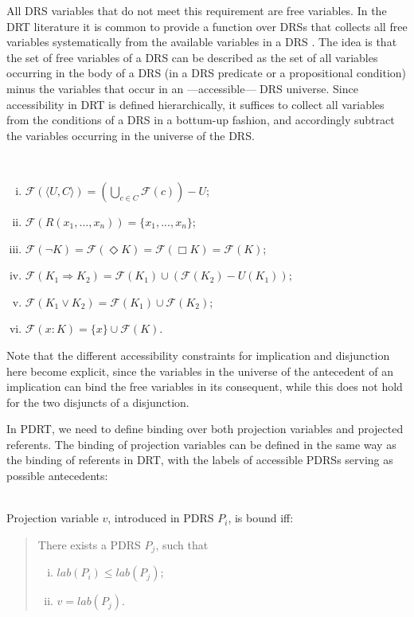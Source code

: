 \noindent All DRS variables that do not meet this requirement are free
variables. In the DRT literature it is common to provide a function over
DRSs that collects all free variables systematically from the available
variables in a DRS
. The idea is that the set of free variables of a DRS can be described
as the set of all variables occurring in the body of a DRS (in a DRS
predicate or a propositional condition) minus the variables that occur in an
---accessible--- DRS universe. Since accessibility in DRT is defined
hierarchically, it suffices to collect all variables from the conditions of
a DRS in a bottum-up fashion, and accordingly subtract the variables
occurring in the universe of the DRS.

\begin{definition}~\label{def:fdrsvs} 
  \begin{enumerate}[i.]
    \item $\mathcal{F}(\langle U, C \rangle)
          = (\bigcup_{c\in C} \mathcal{F}(c)) - U$;
    \item $\mathcal{F}(R(x_1,...,x_n)) = \{x_1,...,x_n\}$;
    \item $\mathcal{F}(\neg K) 
          = \mathcal{F}(\Diamond K) 
          = \mathcal{F}(\Box K)
          = \mathcal{F}(K)$;
    \item $\mathcal{F}(K_1 \Rightarrow K_2)
          = \mathcal{F}(K_1) \cup (\mathcal{F}(K_2) - U(K_1))$;
    \item $\mathcal{F}(K_1 \vee K_2)
          = \mathcal{F}(K_1) \cup \mathcal{F}(K_2)$;
    \item $\mathcal{F}(x:K) = \{x\} \cup \mathcal{F}(K)$.
  \end{enumerate}
\end{definition}

\noindent Note that the different accessibility constraints for implication
and disjunction here become explicit, since the variables in the universe of
the antecedent of an implication can bind the free variables in its
consequent, while this does not hold for the two disjuncts of a disjunction.

In PDRT, we need to define binding over both projection variables and
projected referents. The binding of projection variables can be defined in
the same way as the binding of referents in DRT, with the labels of
accessible PDRSs serving as possible antecedents:

\begin{definition}~\\
Projection variable $v$, introduced in PDRS $P_i$, is bound iff:
\begin{quote}
There exists a PDRS $P_j$, such that
\begin{enumerate}[i.]
  \item $lab(P_i) \leq lab(P_j)$; 
  \item $v = lab(P_j)$.
\end{enumerate}
\end{quote}
\end{definition}

